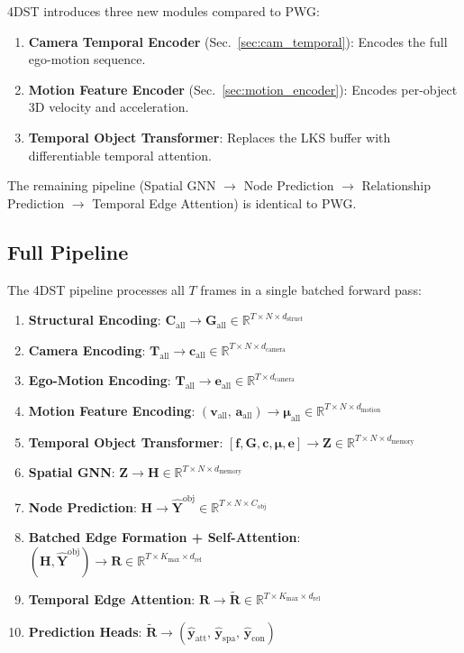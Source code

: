 \documentclass[runningheads]{llncs}
\newcommand{\mR}{\mathbb{R}}
\newcommand{\mat}[1]{\bm{#1}}
\begin{document}
4DST introduces three new modules compared to PWG:
\begin{enumerate}
    \item \textbf{Camera Temporal Encoder} (Sec.~\ref{sec:cam_temporal}): Encodes the full ego-motion sequence.
    \item \textbf{Motion Feature Encoder} (Sec.~\ref{sec:motion_encoder}): Encodes per-object 3D velocity and acceleration.
    \item \textbf{Temporal Object Transformer}: Replaces the LKS buffer with differentiable temporal attention.
\end{enumerate}
The remaining pipeline (Spatial GNN $\to$ Node Prediction $\to$ Relationship Prediction $\to$ Temporal Edge Attention) is identical to PWG.

\subsection{Full Pipeline}

The 4DST pipeline processes all $T$ frames in a single batched forward pass:
\begin{enumerate}
    \item \textbf{Structural Encoding}: $\mat{C}_{\text{all}} \to \mat{G}_{\text{all}} \in \mR^{T \times N \times d_{\text{struct}}}$
    \item \textbf{Camera Encoding}: $\mat{T}_{\text{all}} \to \mat{c}_{\text{all}} \in \mR^{T \times N \times d_{\text{camera}}}$
    \item \textbf{Ego-Motion Encoding}: $\mat{T}_{\text{all}} \to \mat{e}_{\text{all}} \in \mR^{T \times d_{\text{camera}}}$
    \item \textbf{Motion Feature Encoding}: $(\mat{v}_{\text{all}},\, \mat{a}_{\text{all}}) \to \mat{\mu}_{\text{all}} \in \mR^{T \times N \times d_{\text{motion}}}$
    \item \textbf{Temporal Object Transformer}: $[\mat{f}, \mat{G}, \mat{c}, \mat{\mu}, \mat{e}] \to \mat{Z} \in \mR^{T \times N \times d_{\text{memory}}}$
    \item \textbf{Spatial GNN}: $\mat{Z} \to \mat{H} \in \mR^{T \times N \times d_{\text{memory}}}$
    \item \textbf{Node Prediction}: $\mat{H} \to \hat{\mat{Y}}^{\text{obj}} \in \mR^{T \times N \times C_{\text{obj}}}$
    \item \textbf{Batched Edge Formation + Self-Attention}: $(\mat{H}, \hat{\mat{Y}}^{\text{obj}}) \to \mat{R} \in \mR^{T \times K_{\max} \times d_{\text{rel}}}$
    \item \textbf{Temporal Edge Attention}: $\mat{R} \to \tilde{\mat{R}} \in \mR^{T \times K_{\max} \times d_{\text{rel}}}$
    \item \textbf{Prediction Heads}: $\tilde{\mat{R}} \to (\hat{\mat{y}}_{\text{att}},\,\hat{\mat{y}}_{\text{spa}},\,\hat{\mat{y}}_{\text{con}})$
\end{enumerate}
\end{document}

